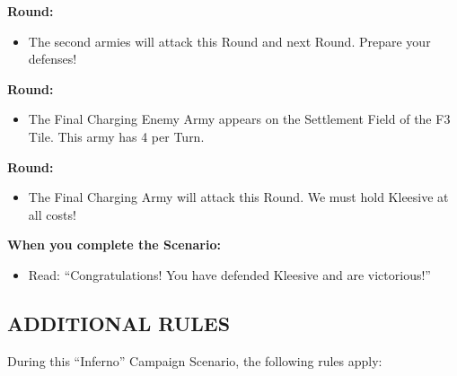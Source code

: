 \begin{multicols}{2}
\textbf{ Round:}
\begin{itemize}
  \item The second armies will attack this Round and next Round. Prepare your defenses!
\end{itemize}


\textbf{ Round:}
\begin{itemize}
  \item The Final Charging Enemy Army appears on the Settlement Field of the F3 Tile.
    This army has 4  per Turn.
\end{itemize}

\textbf{ Round:}
\begin{itemize}
  \item The Final Charging Army will attack this Round.
    We must hold Kleesive at all costs!
\end{itemize}

\textbf{When you complete the Scenario:}
\begin{itemize}
  \item Read: ``Congratulations! You have defended Kleesive and are victorious!''
\end{itemize}

\subsection*{\MakeUppercase{Additional Rules}}

During this ``Inferno'' Campaign Scenario, the following rules apply:


\end{multicols}
